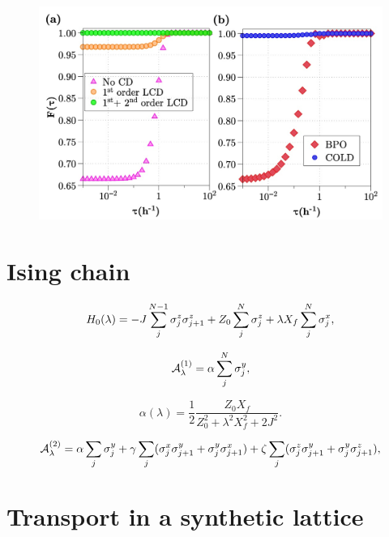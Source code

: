 \begin{figure}[t]
    \centering
    \includegraphics[width=0.8\linewidth]{images/twospins_fidelities.jpg} \caption[COLD applied to two-spin annealing]{}\label{fig:twospin_fidelities}
\end{figure}

\section{Ising chain}\label{sec:5.2_Ising_chain}

\begin{equation}\label{eq:ising_chain_hamiltonian}
    H_0(\lambda) = - J \sum_{j}^{N-1} \sigma^z_j \sigma^z_{j+1} + Z_0\sum_j^N \sigma^z_j + \lambda X_f \sum_j^N \sigma^x_j,
\end{equation}

\begin{equation}
    \mathcal{A}_{\lambda}^{(1)} = \alpha \sum_{j}^N\sigma^y_j,
\end{equation}

\begin{equation}
    \alpha(\lambda) = \frac{1}{2} \frac{Z_0 X_f}{Z_0^2 + \lambda^2 X_f^2 + 2J^2}.
\end{equation}

\begin{equation}
    \mathcal{A}_{\lambda}^{(2)} = \alpha \sum_{j} \sigma^y_j + \gamma  \sum_{j} (\sigma^x_j \sigma^y_{j+1} + \sigma^y_j \sigma^x_{j+1}) +  \zeta \sum_{j} (\sigma^z_j \sigma^y_{j+1} + \sigma^y_j \sigma^z_{j+1}) ,
\end{equation}

\section{Transport in a synthetic lattice}

